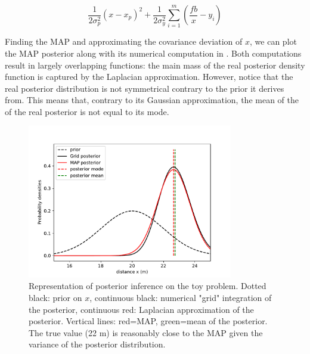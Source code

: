 \begin{equation}
    \frac{1}{2 \sigma_p^2}(x - x_p)^2 + \frac{1}{2\sigma_y^2} \sum_{i=1}^m (\frac{fb}{x} - y_i)
\end{equation}

Finding the MAP and approximating the covariance deviation of $x$, we can plot the MAP posterior along with its numerical computation in . 
Both computations result in largely overlapping functions: the main mass of the real posterior density function is captured by the Laplacian approximation.
However, notice that the real posterior distribution is not symmetrical contrary to the prior it derives from. This means that, contrary to its Gaussian approximation, the mean of the
of the real posterior is not equal to its mode. 

\begin{figure}[h]
    \centering
    \includegraphics[width=0.8\textwidth]{figures/MAP_stereo1D.pdf}
    \caption{Representation of posterior inference on the toy problem. Dotted black: prior on $x$, 
    continuous black: numerical "grid" integration of the posterior, continuous red: Laplacian approximation of the posterior. 
    Vertical lines: red=MAP, green=mean of the posterior. The true value (22 m) is reasonably close to the MAP given the variance 
    of the posterior distribution.
    }
    \label{fig:MAP_stereo1D}
 \end{figure}




